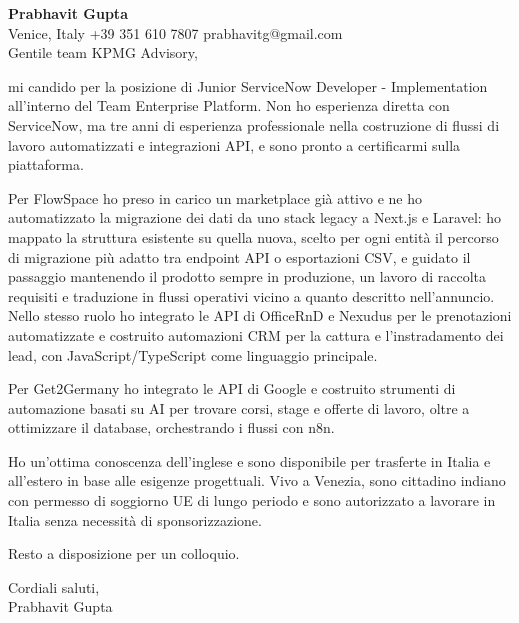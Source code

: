 \documentclass[a4paper,10.5pt]{article}
\begin{document}
\textbf{Prabhavit Gupta}\\
Venice, Italy \textbar{} +39 351 610 7807 \textbar{} prabhavitg@gmail.com\\[10pt]
Gentile team KPMG Advisory,

mi candido per la posizione di Junior ServiceNow Developer - Implementation all'interno del Team Enterprise Platform. Non ho esperienza diretta con ServiceNow, ma tre anni di esperienza professionale nella costruzione di flussi di lavoro automatizzati e integrazioni API, e sono pronto a certificarmi sulla piattaforma.

Per FlowSpace ho preso in carico un marketplace già attivo e ne ho automatizzato la migrazione dei dati da uno stack legacy a Next.js e Laravel: ho mappato la struttura esistente su quella nuova, scelto per ogni entità il percorso di migrazione più adatto tra endpoint API o esportazioni CSV, e guidato il passaggio mantenendo il prodotto sempre in produzione, un lavoro di raccolta requisiti e traduzione in flussi operativi vicino a quanto descritto nell'annuncio. Nello stesso ruolo ho integrato le API di OfficeRnD e Nexudus per le prenotazioni automatizzate e costruito automazioni CRM per la cattura e l'instradamento dei lead, con JavaScript/TypeScript come linguaggio principale.

Per Get2Germany ho integrato le API di Google e costruito strumenti di automazione basati su AI per trovare corsi, stage e offerte di lavoro, oltre a ottimizzare il database, orchestrando i flussi con n8n.

Ho un'ottima conoscenza dell'inglese e sono disponibile per trasferte in Italia e all'estero in base alle esigenze progettuali. Vivo a Venezia, sono cittadino indiano con permesso di soggiorno UE di lungo periodo e sono autorizzato a lavorare in Italia senza necessità di sponsorizzazione.

Resto a disposizione per un colloquio.

Cordiali saluti,\\
Prabhavit Gupta
\end{document}
